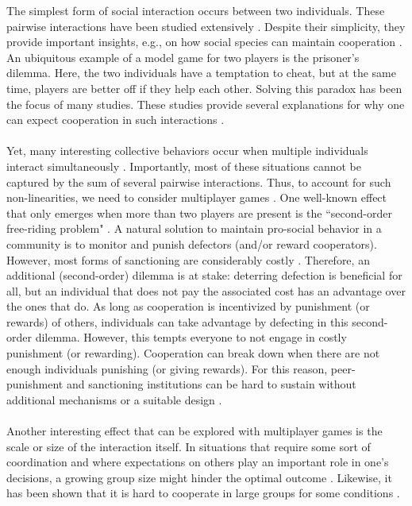 \documentclass[11pt]{article}
\theoremstyle{plainCl1}
\theoremstyle{plainCl2}
\begin{document}
The simplest form of social interaction occurs between two individuals. These pairwise interactions have been studied extensively \cite{Hofbauer:book:1998}. Despite their simplicity, they provide important insights, e.g., on how social species can maintain cooperation \cite{Axelrod:book:1984, Nowak:book:2011}. An ubiquitous example of a model game for two players is the prisoner's dilemma. Here, the two individuals have a temptation to cheat, but at the same time, players are better off if they help each other. Solving this paradox has been the focus of many studies. These studies provide several explanations for why one can expect cooperation in such interactions \cite{Nowak:Science:2006}. 
\\ \\
\noindent Yet, many interesting collective behaviors occur when multiple individuals interact simultaneously \cite{Palm:JMB:1984, Skyrms:book:2003, Pacheco:PRSB:2009, Archetti:EL:2011, Archetti:JTB:2012, Gokhale:DGAA:2014, Hilbe:JTB:2015, Venkateswaran:PRSB:2019}.
Importantly, most of these situations cannot be captured by the sum of several pairwise interactions. Thus, to account for such non-linearities, we need to consider multiplayer games \cite{Gokhale:DGAA:2014}. One well-known effect that only emerges when more than two players are present is the ``second-order free-riding problem" \cite{Fowler:PNAS:2005}. A natural solution to maintain pro-social behavior in a community is to monitor and punish defectors (and/or reward cooperators). However, most forms of sanctioning are considerably costly \cite{Henrich:Science:2006}. Therefore, an additional (second-order) dilemma is at stake: deterring defection is beneficial for all, but an individual that does not pay the associated cost has an advantage over the ones that do. As long as cooperation is incentivized by punishment (or rewards) of others, individuals can take advantage by defecting in this second-order dilemma. However, this tempts everyone to not engage in costly punishment (or rewarding). Cooperation can break down when there are not enough individuals punishing (or giving rewards). For this reason, peer-punishment and sanctioning institutions can be hard to sustain without additional mechanisms or a suitable design \cite{Panchanathan:Nature:2004, Perc:SciRep:2012, Hilbe:SciRep:2012, Couto:JTB:2020, Pal:NatCom:2022}.
\\ \\
\noindent 
Another interesting effect that can be explored with multiplayer games is the scale or size of the interaction itself. In situations that require some sort of coordination and where expectations on others play an important role in one's decisions, a growing group size might hinder the optimal outcome \cite{Skyrms:book:2003}. Likewise, it has been shown that it is hard to cooperate in large groups for some conditions \cite{Santos:PNAS:2011, Hilbe:JTB:2015}.
\end{document}
